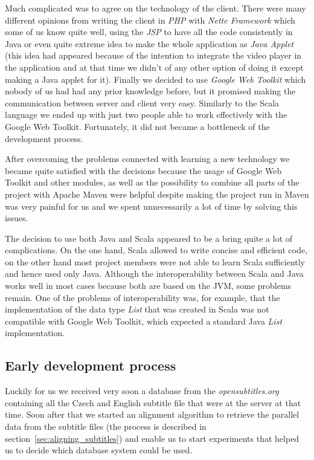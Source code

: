 Much complicated was to agree on the technology of the client. There were many different opinions from writing the client in {\it PHP} with {\it Nette Framework} which some of us know quite well, using the {\it JSP} to have all the code consistently in Java or even quite extreme idea to make the whole application as {\it Java Applet} (this idea had appeared because of the intention to integrate the video player in the application and at that time we didn't of any other option of doing it except making a Java applet for it). Finally we decided to use {\it Google Web Toolkit} which nobody of us had had any prior knowledge before, but it promised making the communication between server and client very easy. Similarly to the Scala language we ended up with just two people able to work effectively with the Google Web Toolkit. Fortunately, it did not became a bottleneck of the development process. 

After overcoming the problems connected with learning a new technology we became quite satisfied with the decisions because the usage of Google Web Toolkit and other modules, as well as the possibility to combine all parts of the project with Apache Maven were helpful despite making the project run in Maven was very painful for us and we spent unnecessarily a lot of time by solving this issues.
	
The decision to use both Java and Scala appeared to be a bring quite a lot of complications. On the one hand, Scala allowed to write concise and efficient code, on the other hand most project members were not able to learn Scala sufficiently and hence used only Java. Although the interoperability between Scala and Java works well in most cases because both are based on the JVM, some problems remain. One of the problems of interoperability was, for example, that the implementation of the data type \emph{List} that was created in Scala was not compatible with Google Web Toolkit, which expected a standard Java \emph{List} implementation.

\subsection{Early development process}

Luckily for us we received very soon a database from the {\it opensubtitles.org} containing all the Czech and English subtitle file that were at the server at that time. Soon after that we started an alignment algorithm to retrieve the parallel data from the subtitle files (the process is described in section~\ref{sec:aligning_subtitles}) and enable us to start experiments that helped us to decide which database system could be used.

